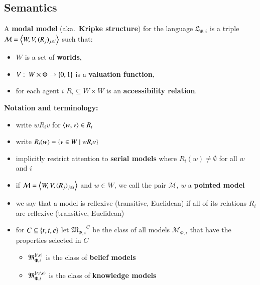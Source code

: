 \documentclass[nobib,nofonts]{tufte-handout}
\newcommand{\Props}{\ensuremath{\Phi}}
\newcommand{\Lang}{\ensuremath{\mathfrak{L}}}
\newcommand{\ts}{\ensuremath{\thinspace}}
\newcommand{\mybar}{\ensuremath{\ | \ }}
\newcommand{\ra}{\ensuremath{\rightarrow}}
\newcommand{\Model}{\ensuremath{\mathcal{M}}}
\newcommand{\Models}{\ensuremath{\mathfrak{M}_{\Props,i}}}
\begin{document}
\subsection{Semantics}
\label{sec:semantics}

\begin{definition}[Model]
  \label{def:Semantics_modal_logic}
  A \textbf{modal model} (aka.~\textbf{Kripke structure}) for the language $\Lang_{\Props,i}$ is a
  triple $\Model = \tuple{W,V,(R_j)_{j \le i}}$ such that:
  \begin{itemize}
  \item $W$ is a set of \textbf{worlds},
  \item $V \ts \colon \ts W \times \Props  \ra \set{0,1}$
    is a \textbf{valuation function},
  \item for each agent $i$ $R_i \subseteq W
    \times W$ is an \textbf{accessibility relation}.
  \end{itemize}

\end{definition}


\textbf{Notation and terminology:}

\begin{itemize}
\item write $wR_iv$ for $\left \langle w,v\right\rangle \in R_i$
\item write $R_i(w) = \set{v
    \in W \mybar wR_iv}$
\item implicitly restrict attention to \textbf{serial models} where
  $R_i(w) \neq \emptyset$ for all $w$ and $i$
\item if $\Model = \tuple{W,V,(R_j)_{j \le i}}$ and $w \in W$, we call
  the pair $\Model$, $w$ a \textbf{pointed model}
\item we say that a model is reflexive (transitive, Euclidean) if all
  of its relations $R_i$ are reflexive (transitive, Euclidean)
\item for $C \subseteq \left\{r,t,e\right\}$ let $\Models^C$ be the class of
  all models $\Model_{\Props,i}$ that have the properties selected in
  $C$
  \begin{itemize}
  \item $\Models^{\set{t,e}}$ is the class of \textbf{belief models}
  \item $\Models^{\set{r,t,e}}$ is the class of \textbf{knowledge
      models}
  \end{itemize}

\end{itemize}
\end{document}
